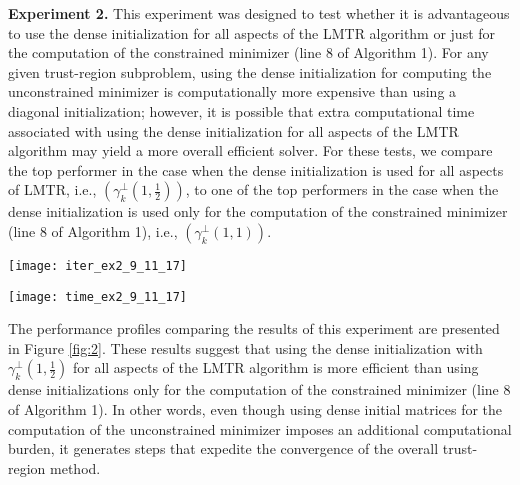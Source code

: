 	
\bigskip
\noindent
{\bf Experiment 2.} This experiment was designed to test whether
it is advantageous to use the dense initialization for all aspects of the
{\small LMTR} algorithm or just for the computation of the constrained minimizer (line 8 of Algorithm 1).
For any given trust-region subproblem, using the dense initialization for computing the unconstrained minimizer is computationally
more expensive than using a diagonal initialization; however, it is possible
that extra computational time associated with using the dense initialization for all
aspects of the {\small LMTR} algorithm may yield
a more overall efficient solver.
For these tests, we compare the top performer 
in the case when the dense initialization
is used for all aspects of {\small LMTR}, 
i.e., $(\gamma_k^{\perp}(1,\frac{1}{2}))$, to one of the top performers in
  the case when the dense initialization is used only for the
computation of the constrained minimizer (line 8 of Algorithm 1),
  i.e., $(\gamma_k^{\perp}(1,1))$.

	\begin{figure*}[h!]
				\begin{minipage}{0.48\textwidth}
					\texttt{[image: iter\_ex2\_9\_11\_17]}
				\end{minipage}
				\hfill
				\begin{minipage}{0.48\textwidth}
							\texttt{[image: time\_ex2\_9\_11\_17]}
				\end{minipage}
				\caption{
Performance profiles of \texttt{iter} (left) and
\texttt{time} (right) for Experiment 2.  
In the legend, 
the asterisk after
$\widehat{B}_0(1,\frac{1}{2})^*$
 signifies that the dense initialization 
was used for all aspects of the {\small LMTR} algorithm;
without the asterisk,
$\widehat{B}_0(1,1)$
signifies the test where the dense initialization 
is used only for the computation of the constrained minimizer (line 8 of Algorithm 1).
}
			\label{fig:2}       
	\end{figure*}

The performance profiles comparing
the results of this experiment
are presented in Figure \ref{fig:2}.   
        These results suggest that using the dense initialization
        with 
        $\gamma_k^{\perp}(1,\frac{1}{2})$
	for all aspects of
	the {\small LMTR} algorithm is more efficient than using dense
	initializations only for the computation of the constrained minimizer (line 8 of Algorithm 1).
	In other words, even though using dense initial matrices for the computation of the
        unconstrained minimizer imposes 
        an additional computational burden,
        it generates steps that expedite the convergence of the overall trust-region method.

